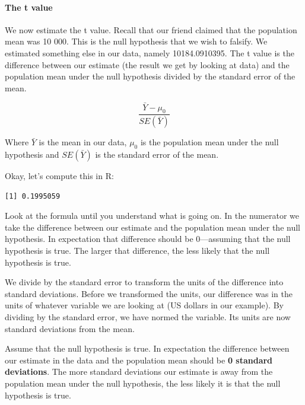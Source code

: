 \documentclass[]{article}
\newenvironment{Shaded}{\begin{snugshade}}{\end{snugshade}}
\newcommand{\KeywordTok}[1]{\textcolor[rgb]{0.13,0.29,0.53}{\textbf{#1}}}
\newcommand{\DecValTok}[1]{\textcolor[rgb]{0.00,0.00,0.81}{#1}}
\newcommand{\StringTok}[1]{\textcolor[rgb]{0.31,0.60,0.02}{#1}}
\newcommand{\OperatorTok}[1]{\textcolor[rgb]{0.81,0.36,0.00}{\textbf{#1}}}
\newcommand{\NormalTok}[1]{#1}
\let\oldparagraph\paragraph
\renewcommand{\paragraph}[1]{\oldparagraph{#1}\mbox{}}
\theoremstyle{definition}
\theoremstyle{definition}
\theoremstyle{definition}
\theoremstyle{remark}
\begin{document}
\paragraph{The t value}\label{the-t-value}

We now estimate the t value. Recall that our friend claimed that the
population mean was 10 000. This is the null hypothesis that we wish to
falsify. We estimated something else in our data, namely 10184.0910395.
The t value is the difference between our estimate (the result we get by
looking at data) and the population mean under the null hypothesis
divided by the standard error of the mean.

\[ \frac{ \bar{Y} - \mu_0 } {SE(\bar{Y})} \]

Where \(\bar{Y}\) is the mean in our data, \(\mu_0\) is the population
mean under the null hypothesis and \(SE(\bar{Y})\) is the standard error
of the mean.

Okay, let's compute this in R:

\begin{Shaded}
\end{Shaded}

\begin{verbatim}
[1] 0.1995059
\end{verbatim}

Look at the formula until you understand what is going on. In the
numerator we take the difference between our estimate and the population
mean under the null hypothesis. In expectation that difference should be
0---assuming that the null hypothesis is true. The larger that
difference, the less likely that the null hypothesis is true.

We divide by the standard error to transform the units of the difference
into standard deviations. Before we transformed the units, our
difference was in the units of whatever variable we are looking at (US
dollars in our example). By dividing by the standard error, we have
normed the variable. Its units are now standard deviations from the
mean.

Assume that the null hypothesis is true. In expectation the difference
between our estimate in the data and the population mean should be
\textbf{0 standard deviations}. The more standard deviations our
estimate is away from the population mean under the null hypothesis, the
less likely it is that the null hypothesis is true.
\end{document}
